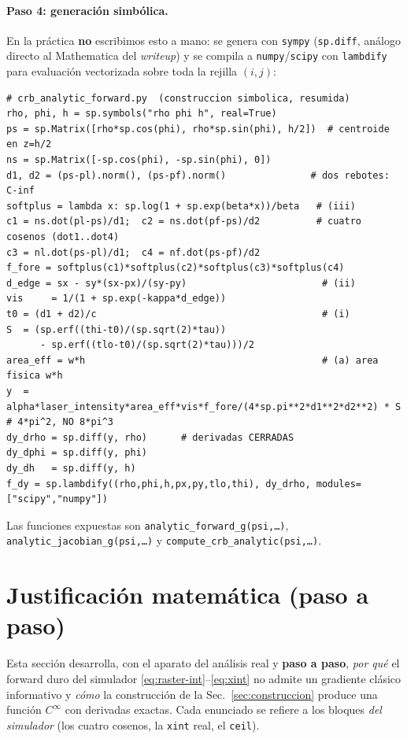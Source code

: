 \documentclass[11pt,a4paper]{article}
\theoremstyle{plain}
\theoremstyle{definition}
\begin{document}
\paragraph{Paso 4: generaci\'on simb\'olica.} En la pr\'actica \textbf{no}
escribimos esto a mano: se genera con \texttt{sympy} (\texttt{sp.diff}, an\'alogo
directo al Mathematica del \emph{writeup}) y se compila a
\texttt{numpy}/\texttt{scipy} con \texttt{lambdify} para evaluaci\'on vectorizada
sobre toda la rejilla $(i,j)$:
\begin{lstlisting}
# crb_analytic_forward.py  (construccion simbolica, resumida)
rho, phi, h = sp.symbols("rho phi h", real=True)
ps = sp.Matrix([rho*sp.cos(phi), rho*sp.sin(phi), h/2])  # centroide en z=h/2
ns = sp.Matrix([-sp.cos(phi), -sp.sin(phi), 0])
d1, d2 = (ps-pl).norm(), (ps-pf).norm()               # dos rebotes: C-inf
softplus = lambda x: sp.log(1 + sp.exp(beta*x))/beta   # (iii)
c1 = ns.dot(pl-ps)/d1;  c2 = ns.dot(pf-ps)/d2          # cuatro cosenos (dot1..dot4)
c3 = nl.dot(ps-pl)/d1;  c4 = nf.dot(ps-pf)/d2
f_fore = softplus(c1)*softplus(c2)*softplus(c3)*softplus(c4)
d_edge = sx - sy*(sx-px)/(sy-py)                        # (ii)
vis     = 1/(1 + sp.exp(-kappa*d_edge))
t0 = (d1 + d2)/c                                        # (i)
S  = (sp.erf((thi-t0)/(sp.sqrt(2)*tau))
      - sp.erf((tlo-t0)/(sp.sqrt(2)*tau)))/2
area_eff = w*h                                          # (a) area fisica w*h
y  = alpha*laser_intensity*area_eff*vis*f_fore/(4*sp.pi**2*d1**2*d2**2) * S  # 4*pi^2, NO 8*pi^3
dy_drho = sp.diff(y, rho)      # derivadas CERRADAS
dy_dphi = sp.diff(y, phi)
dy_dh   = sp.diff(y, h)
f_dy = sp.lambdify((rho,phi,h,px,py,tlo,thi), dy_drho, modules=["scipy","numpy"])
\end{lstlisting}
Las funciones expuestas son \texttt{analytic\_forward\_g(psi,\dots)},
\texttt{analytic\_jacobian\_g(psi,\dots)} y \texttt{compute\_crb\_analytic(psi,\dots)}.

\section{Justificaci\'on matem\'atica (paso a paso)}
\label{sec:justificacion}

Esta secci\'on desarrolla, con el aparato del an\'alisis real y \textbf{paso a
paso}, \emph{por qu\'e} el forward duro del simulador
\eqref{eq:raster-int}--\eqref{eq:xint} no admite un gradiente cl\'asico
informativo y \emph{c\'omo} la construcci\'on de la Sec.~\ref{sec:construccion}
produce una funci\'on $C^\infty$ con derivadas exactas. Cada enunciado se refiere a
los bloques \emph{del simulador} (los cuatro cosenos, la \texttt{xint} real, el
\texttt{ceil}).
\end{document}
